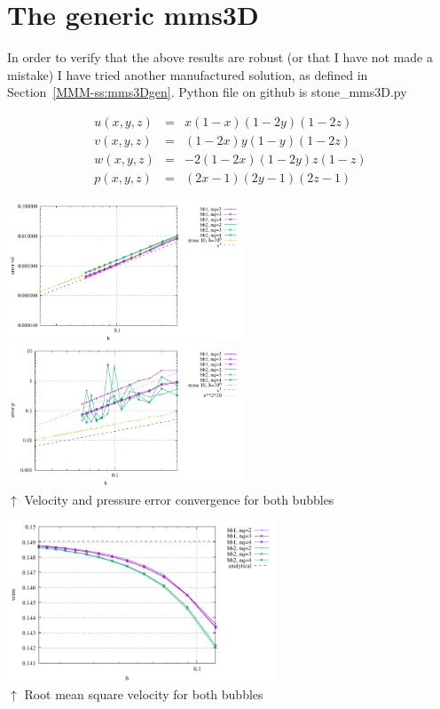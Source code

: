 \newpage
\section*{The generic mms3D} In order to verify that 
the above results are robust (or that I have not made a mistake)
I have tried another manufactured solution, as defined in Section~\ref{MMM-ss:mms3Dgen}. 
Python file on github is {\pythonfile stone\_mms3D.py}

\begin{eqnarray}
u(x,y,z) &=& x(1-x)(1-2y)(1-2z)\\
v(x,y,z) &=& (1-2x) y(1-y) (1-2z) \\
w(x,y,z) &=& -2(1-2x)(1-2y)z(1-z) \\
p(x,y,z) &=& (2x-1)(2y-1)(2z-1)
\end{eqnarray}

\begin{center}
\includegraphics[width=7cm]{python_codes/fieldstone_75/results/mms3D/errorsV.pdf}
\includegraphics[width=7cm]{python_codes/fieldstone_75/results/mms3D/errorsP.pdf}\\
{\captionfont $\uparrow$ Velocity and pressure error convergence for both bubbles}
\end{center}

\begin{center}
\includegraphics[width=8cm]{python_codes/fieldstone_75/results/mms3D/vrms.pdf}\\
{\captionfont $\uparrow$ Root mean square velocity for both bubbles}
\end{center}

